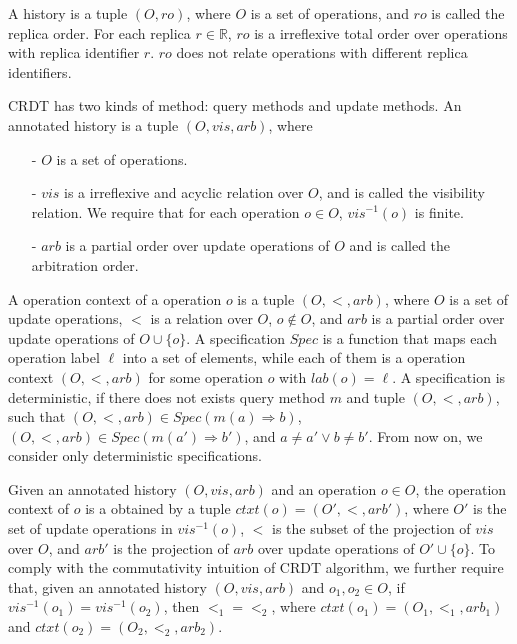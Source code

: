 A history is a tuple $(O,\mathit{ro})$, where $O$ is a set of operations, and $\mathit{ro}$ is called the replica order. For each replica $r \in \mathbb{R}$, $\mathit{ro}$ is a irreflexive total order over operations with replica identifier $r$. $\mathit{ro}$ does not relate operations with different replica identifiers. %

CRDT has two kinds of method: query methods and update methods. An annotated history is a tuple $(O,\mathit{vis},\mathit{arb})$, where

\begin{itemize}
\setlength{\itemsep}{0.5pt}
\item[-] $O$ is a set of operations. 

\item[-] $\mathit{vis}$ is a irreflexive and acyclic relation over $O$, and is called the visibility relation. We require that for each operation $o \in O$, $\mathit{vis}^{-1}(o)$ is finite.

\item[-] $\mathit{arb}$ is a partial order over update operations of $O$ and is called the arbitration order. 
\end{itemize} 

A operation context of a operation $o$ is a tuple $(O,<,\mathit{arb})$, where $O$ is a set of update operations, $<$ is a relation over $O$, $o \notin O$, and $\mathit{arb}$ is a partial order over update operations of $O \cup \{ o \}$. A specification $Spec$ is a function that maps each operation label $\ell$ into a set of elements, while each of them is a operation context $(O,<,\mathit{arb})$ for some operation $o$ with $lab(o) = \ell$. A specification is deterministic, if there does not exists query method $m$ and tuple $(O,<,\mathit{arb})$, such that $(O,<,\mathit{arb}) \in Spec(m(a) \Rightarrow b)$, $(O,<,\mathit{arb}) \in Spec(m(a') \Rightarrow b')$, and $a \neq a' \vee b \neq b'$. From now on, we consider only deterministic specifications. 

Given an annotated history $(O,\mathit{vis},\mathit{arb})$ and an operation $o \in O$, the operation context of $o$ is a obtained by a tuple $ctxt(o)=(O',<,\mathit{arb}')$, where $O'$ is the set of update operations in $\mathit{vis}^{-1}(o)$, $<$ is the subset of the projection of $\mathit{vis}$ over $O$, and $\mathit{arb}'$ is the projection of $\mathit{arb}$ over update operations of $O' \cup \{ o \}$. To comply with the commutativity intuition of CRDT algorithm, we further require that, given an annotated history $(O,\mathit{vis},\mathit{arb})$ and $o_1,o_2 \in O$, if $\mathit{vis}^{-1}(o_1) = \mathit{vis}^{-1}(o_2)$, then $<_1 = <_2$, where $ctxt(o_1)=(O_1,<_1,\mathit{arb}_1)$ and $ctxt(o_2)=(O_2,<_2,\mathit{arb}_2)$.


